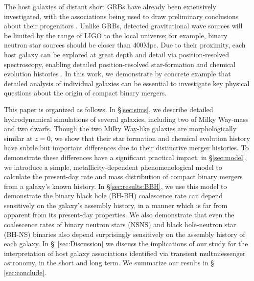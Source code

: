\documentclass[nofootinbib,twocolumn,prd]{emulateapj}
\newcommand\editremark[1]{{\color{red}#1}}
\newcommand\unit[1]{\text{#1}}
\begin{document}
The host galaxies of distant short GRBs have already been extensively investigated, with the associations being used to
draw preliminary conclusions about their progenitors  \citep{2014ARAA..52...43B}.   
Unlike GRBs, detected gravitational wave sources will be limited by the range of LIGO to the local universe; for
example,  binary neutron star sources should be closer than $400\unit{Mpc}$.  Due to their proximity, each host galaxy
can be explored at great depth and detail via  position-resolved spectroscopy, enabling detailed position-resolved star-formation
and chemical evolution histories  \citep[see,e.g.][]{2009MNRAS.396..462K,2014MNRAS.444..336C,
  Dalcanton09,Williams11,CALIFA}.  
In this work, we demonstrate by concrete example that detailed analysis of individual galaxies can be essential to
investigate key physical questions about the origin of compact binary mergers. 



This paper is organized as follows. 
In \S \ref{sec:sims}, we describe detailed hydrodynamical simulations of  several galaxies, including two of Milky Way-mass and two dwarfs.  Though the two Milky Way-like galaxies are morphologically similar at $z = 0$, we
show that their star formation and chemical evolution history have subtle but important differences due to their
distinctive merger histories.   To demonstrate
these differences have a significant practical impact,  in \S \ref{sec:model}, we introduce a simple,
metallicity-dependent  phenomenological model to calculate the present-day rate and mass distribution of compact binary
mergers from  a galaxy's known history.   In \S \ref{sec:results:BBH}, we use this model to demonstrate the binary black
hole (BH-BH) coalescence rate
can depend sensitively on the galaxy's assembly history, in a manner which is far from apparent from its present-day
properties.    We also demonstrate that even the coalescence rates of binary neutron stars (NSNS) and black hole-neutron
star (BH-NS) binaries also depend surprisingly sensitively on the assembly history of each galaxy. 
In \S~\ref{sec:Discussion} we discuss the implications of our study for the interpretation of host galaxy associations
identified via transient multmiessenger astronomy, in the short and long term.  We summarize our results in \S~ \ref{sec:conclude}.
%
\end{document}
